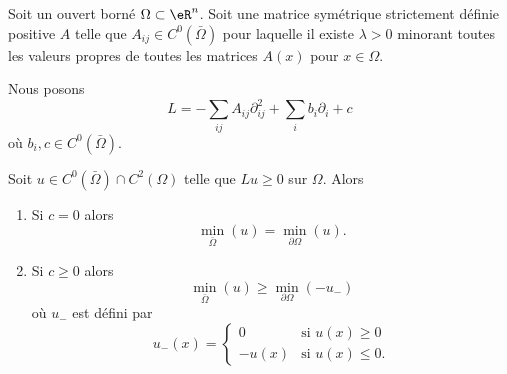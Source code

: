 \begin{lemma}        \label{LEMooDVUYooHEkrsL}
	Soit un ouvert borné \( \Omega\subset \eR^n\). Soit une matrice symétrique strictement définie positive \( A\) telle que \( A_{ij}\in C^0(\bar \Omega)\) pour laquelle il existe \( \lambda>0\) minorant toutes les valeurs propres de toutes les matrices \( A(x)\) pour \( x\in \Omega\).

	Nous posons
	\begin{equation}
		L=-\sum_{ij}A_{ij}\partial^2_{ij}+\sum_ib_i\partial_i+c
	\end{equation}
	où \( b_i,c\in C^0(\bar \Omega)\).

	Soit \( u\in C^0(\bar \Omega)\cap C^2(\Omega)\) telle que \( Lu\geq 0\) sur \( \Omega\). Alors
	\begin{enumerate}
		\item       \label{ITEMooZNUVooNGPXVc}
		      Si \( c=0\) alors
		      \begin{equation}        \label{EQooOJRWooIMemRN}
			      \min_{\bar \Omega}(u)=\min_{\partial\Omega}(u).
		      \end{equation}
		\item       \label{ITEMooQOQIooJqTzdA}
		      Si \( c\geq 0\) alors
		      \begin{equation}        \label{EQooGSXVooGUnRnt}
			      \min_{\bar\Omega}(u)\geq \min_{\partial\Omega}(-u_-)
		      \end{equation}
		      où \( u_-\) est défini par
		      \begin{equation}
			      u_-(x)=\begin{cases}
				      0     & \text{si } u(x)\geq 0 \\
				      -u(x) & \text{si }u(x)\leq 0.
			      \end{cases}
		      \end{equation}
	\end{enumerate}
\end{lemma}

